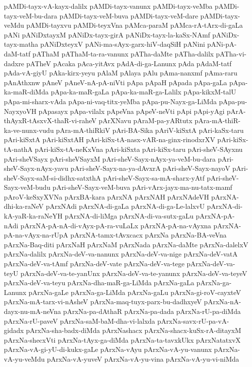 {pAMDi-tayx-vA-kayx-dalilx
pAMDi-tayx-vanunx
pAMDi-tayx-veMba
pAMDi-tayx-veM-bu-dara
pAMDi-tayx-veM-buva
pAMDi-tayx-veM-dare
pAMDi-tayx-veMdu
pAMDi-tayxvu
pAMDi-teyxVna
pAMca-paraM
pAMca-rA-tArx-di-gaLa
pANi
pANiDxtayxM
pANiDx-tayx-girA
pANiDx-tayx-la-kaSx-NAmf
pANiDx-tayx-matha
pANiDxteyxV
pANi-ma-sAyx-garx-hiV-daqSiH
pANini
pANi-pA-daM-tatf
pAThaM
pAThaM-ta-ra-vanunx
pATha-daMte
pATha-dalilx
pATha-vi-dadxre
pATheV
pAcaka
pAca-yitAvx
pAdA-di-ga-Lanunx
pAda
pAdaM-tatf
pAda-vA-giyU
pAka-kirx-yeyu
pAlaM
pAlaya
pAlu
pAma-nanxmf
pAma-raru
pAnAthxnw
pAneV
pAneV-nA-pA-niVti
pApa
pApaH
pApada
pApa-gaLa
pApa-ka-maR-diMda
pApa-ka-maR-gaLa
pApa-ka-maR-ga-Lalilx
pApa-kikxM-talU
pApa-mi-sharx-vAda
pApa-ni-vaq-titx-yeMba
pApa-pu-Nayx-ga-LiMda
pApa-pu-NayxyoVH
pApasayx
pApa-vilalx
pApeVna
pApeV-neVti
pApi
pApi-yAgi
pArA-thAyxR-tAsxvX-thaR-vi-raheV
pArXNavu
pAraM-pa-yARtutx
pAra-mA-thiR-ka-ve-nunx-vudu
pAra-mA-thiRkiV
pAri-BA-Sika
pAriV-kiSxtA
pAri-kaSx-taru
pAri-kiSxtA
pAri-kiSxtAH
pAri-kiSx-tA-nasx-vAR-na-ginx-rinodxrXV
pAri-kiSx-tA-nathA
pAri-kiSx-tA-neKxVna
pAri-kiSxta
pAri-kiSx-taru
pAri-sheV-SAyxnu
pAri-sheVSayx
pAri-sheVSayxM
pAri-sheV-Sayx-nAyx-ya-veM-bu-dara
pAri-sheV-Sayx-nAyx-yavu
pAri-sheV-Sayx-na-ya-dAvxrA
pAri-sheV-Sayx-nayoV
pAri-sheV-Sayx-saM-si-didhx-satxthA
pAri-sheV-Sayx-sa-mA-sharx-yAtf
pAri-sheV-Sayx-veM-budu
pAri-sheV-Sayx-veM-buva
pAri-vArx-jayx-ma-nu-tatx-mamf
pAroV-keSxyXVNa
pArxBA-kara
pArxNA
pArxNAH
pArxNAdeVH
pArxNA-dhi-ka-raNeV
pArxNAdi
pArxNA-di-gaLa
pArxNA-di-ga-Le-lalxvU
pArxNA-di-kA-yaR-ka-raNeYH
pArxNA-di-liMga
pArxNA-di-va-sutx-gaLu
pArxNA-pA-nAdi
pArxNA-pA-nA-di-vAyx-pA-ra-vuLaLx
pArxNA-pA-na-vAyxna
pArxNA-pA-na-vAyx-na-rUpA
pArxNA-tamx-tAvxcacx
pArxNa
pArxNa-BA-veVna
pArxNa-Baq-diti
pArxNaH
pArxNaM
pArxNada
pArxNa-daMte
pArxNa-dalelxV
pArxNa-dalilx
pArxNa-deV-va-nanunx
pArxNa-deV-va-nige
pArxNa-deV-vatA
pArxNa-deV-va-tAmf
pArxNa-deV-vate
pArxNa-deV-va-tege
pArxNa-deV-va-teyU
pArxNa-deV-va-te-yanUnx
pArxNa-deV-va-te-yanunx
pArxNa-deV-va-teyeV
pArxNa-deV-va-teyu
pArxNa-dha-maR-ga-LiMda
pArxNa-gaLa
pArxNa-ga-Lanunx
pArxNa-gaLe
pArxNa-ga-LiMda
pArxNa-gaLu
pArxNa-gi-roV-cayxteV
pArxNa-mA-tarx-vi-nAsheV
pArxNa-maq-tuyx-parx-bu-dadhxyeV
pArxNa-nA-dayx-nu-mA-neVna
pArxNa-pa-dAthaR
pArxNa-pa-dada
pArxNa-rU-pa-diMda
pArxNa-rU-paveV
pArxNa-saM-baM-dha-vi-lalxda
pArxNa-savx-rU-pa-vA-gidadx
pArxNa-sha-badx-diMda
pArxNashacx
pArxNa-shacx-kuSx-rA-ditayxM
pArxNa-shecxVti
pArxNa-tAyx-ga-diMda
pArxNa-ta-tavxkUkx
pArxNatatxvX
pArxNa-vA-gi-yU-di-kukx-gaLe
pArxNa-vAyu
pArxNa-vA-yu-vanunx
pArxNa-vA-yu-veMdu
pArxNa-vA-yuveV
pArxNa-vA-yu-vina
pArxNa-vA-yu-vi-niMda
}
